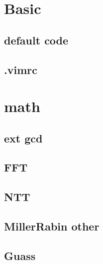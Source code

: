 \documentclass[12pt,twocolumn,oneside,a4paper]{article}
\begin{document}
\pagestyle{fancy}
\fancyfoot{}
\fancyhead[R]{\thepage}
\renewcommand{\headrulewidth}{0.4pt}
\renewcommand{\contentsname}{Contents} 

\scriptsize
\tableofcontents

\newpage

\section{Basic}
\subsection{default code}


\subsection{.vimrc}


\section{math}
\subsection{ext gcd}


\subsection{FFT}


\subsection{NTT}


\subsection{MillerRabin other}


\subsection{Guass}

\end{document}
